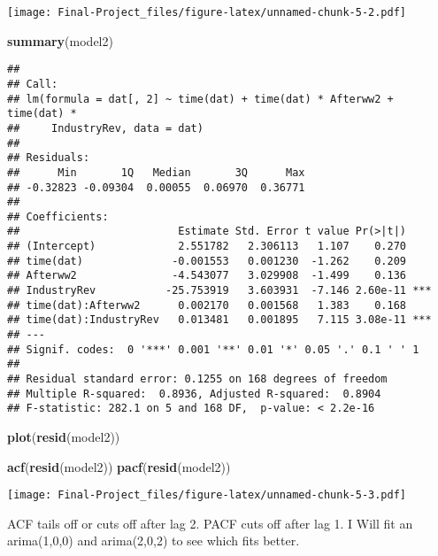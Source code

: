 \documentclass[
]{article}
\newenvironment{Shaded}{\begin{snugshade}}{\end{snugshade}}
\newcommand{\FunctionTok}[1]{\textcolor[rgb]{0.13,0.29,0.53}{\textbf{#1}}}
\newcommand{\NormalTok}[1]{#1}
\begin{document}
\texttt{[image: Final-Project\_files/figure-latex/unnamed-chunk-5-2.pdf]}

\begin{Shaded}
\begin{Highlighting}[]
\FunctionTok{summary}\NormalTok{(model2)}
\end{Highlighting}
\end{Shaded}

\begin{verbatim}
## 
## Call:
## lm(formula = dat[, 2] ~ time(dat) + time(dat) * Afterww2 + time(dat) * 
##     IndustryRev, data = dat)
## 
## Residuals:
##      Min       1Q   Median       3Q      Max 
## -0.32823 -0.09304  0.00055  0.06970  0.36771 
## 
## Coefficients:
##                         Estimate Std. Error t value Pr(>|t|)    
## (Intercept)             2.551782   2.306113   1.107    0.270    
## time(dat)              -0.001553   0.001230  -1.262    0.209    
## Afterww2               -4.543077   3.029908  -1.499    0.136    
## IndustryRev           -25.753919   3.603931  -7.146 2.60e-11 ***
## time(dat):Afterww2      0.002170   0.001568   1.383    0.168    
## time(dat):IndustryRev   0.013481   0.001895   7.115 3.08e-11 ***
## ---
## Signif. codes:  0 '***' 0.001 '**' 0.01 '*' 0.05 '.' 0.1 ' ' 1
## 
## Residual standard error: 0.1255 on 168 degrees of freedom
## Multiple R-squared:  0.8936, Adjusted R-squared:  0.8904 
## F-statistic: 282.1 on 5 and 168 DF,  p-value: < 2.2e-16
\end{verbatim}

\begin{Shaded}
\begin{Highlighting}[]
\FunctionTok{plot}\NormalTok{(}\FunctionTok{resid}\NormalTok{(model2))}

\FunctionTok{acf}\NormalTok{(}\FunctionTok{resid}\NormalTok{(model2))}
\FunctionTok{pacf}\NormalTok{(}\FunctionTok{resid}\NormalTok{(model2))}
\end{Highlighting}
\end{Shaded}

\texttt{[image: Final-Project\_files/figure-latex/unnamed-chunk-5-3.pdf]}

ACF tails off or cuts off after lag 2. PACF cuts off after lag 1. I Will
fit an arima(1,0,0) and arima(2,0,2) to see which fits better.
\end{document}
